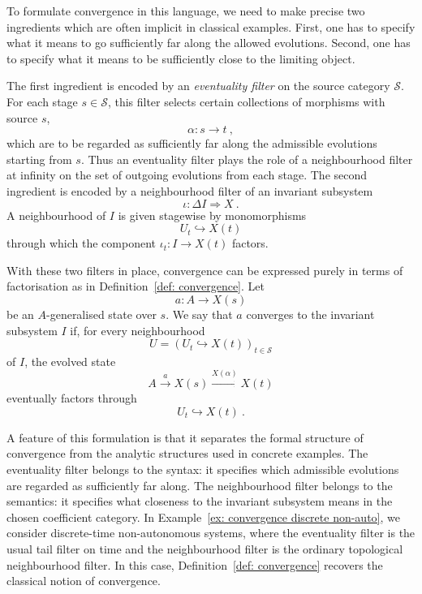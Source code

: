 \documentclass[a4paper,reqno,oneside]{amsart}
\theoremstyle{definition}
\theoremstyle{remark}
\numberwithin{equation}{section}
\begin{document}
To formulate convergence in this language, we need to make precise two
ingredients which are often implicit in classical examples. First, one has to
specify what it means to go sufficiently far along the allowed evolutions.
Second, one has to specify what it means to be sufficiently close to the
limiting object.

The first ingredient is encoded by an \textit{eventuality filter} on the
source category $\mathcal S$. For each stage $s\in\mathcal S$, this filter
selects certain collections of morphisms with source $s$,
\begin{equation}
    \alpha\colon s\to t \ ,
\end{equation}
which are to be regarded as sufficiently far along the admissible evolutions
starting from $s$. Thus an eventuality filter plays the role of a
neighbourhood filter at infinity on the set of outgoing evolutions from each stage. The second ingredient is encoded by a neighbourhood filter of an invariant
subsystem
\begin{equation}
    \iota\colon \Delta I\Longrightarrow X \ .
\end{equation}
A neighbourhood of $I$ is given stagewise by monomorphisms
\begin{equation}
    U_t\hookrightarrow X(t)
\end{equation}
through which the component $\iota_t\colon I\to X(t)$ factors.


With these two filters in place, convergence can be expressed purely in terms of factorisation as in Definition~\ref{def: convergence}. Let
\begin{equation}
    a\colon A\to X(s)
\end{equation}
be an $A$-generalised state over $s$. We say that $a$ converges to the
invariant subsystem $I$ if, for every neighbourhood
\begin{equation}
    U=(U_t\hookrightarrow X(t))_{t\in\mathcal S}
\end{equation}
of $I$, the evolved state
\begin{equation}
    A\xrightarrow{a}X(s)\xrightarrow{X(\alpha)}X(t)
\end{equation}
eventually factors through
\begin{equation}
    U_t\hookrightarrow X(t) \ .
\end{equation}




A feature of this formulation is that it separates the formal
structure of convergence from the analytic structures used in concrete
examples. The eventuality filter belongs to the syntax: it specifies which
admissible evolutions are regarded as sufficiently far along. The
neighbourhood filter belongs to the semantics: it specifies what closeness to
the invariant subsystem means in the chosen coefficient category. In
Example~\ref{ex: convergence discrete non-auto}, we consider discrete-time
non-autonomous systems, where the eventuality filter is the usual tail filter on time and the neighbourhood filter is the ordinary topological
neighbourhood filter. In this case, Definition~\ref{def: convergence}
recovers the classical notion of convergence.
\end{document}
